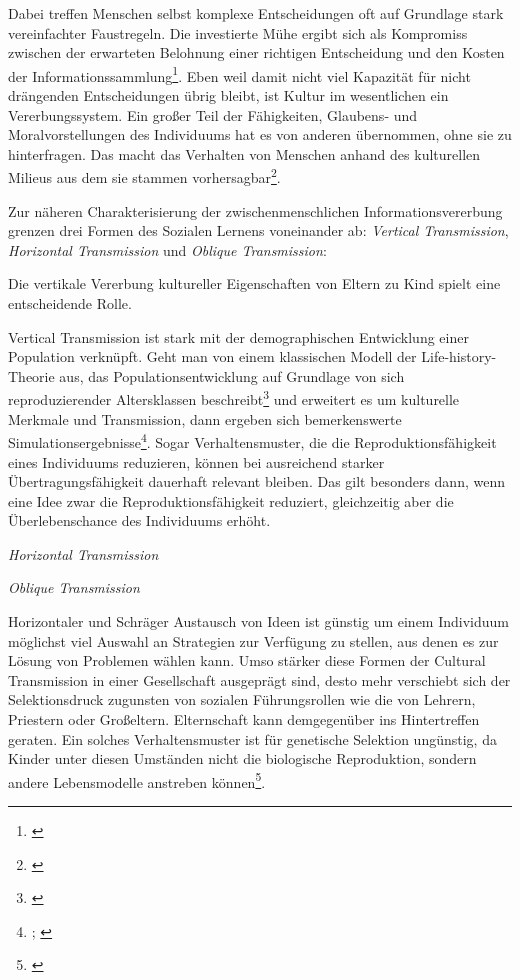 \documentclass[openany,twoside,twocolumn]{book}
\let\rmarkdownfootnote\footnote%
\def\footnote{\protect\rmarkdownfootnote}
\begin{document}
Dabei treffen Menschen selbst komplexe Entscheidungen oft auf Grundlage
stark vereinfachter Faustregeln. Die investierte Mühe ergibt sich als
Kompromiss zwischen der erwarteten Belohnung einer richtigen
Entscheidung und den Kosten der Informationssammlung\footnote{\textcite{nisbett_human_1980}}.
Eben weil damit nicht viel Kapazität für nicht drängenden Entscheidungen
übrig bleibt, ist Kultur im wesentlichen ein Vererbungssystem. Ein
großer Teil der Fähigkeiten, Glaubens- und Moralvorstellungen des
Individuums hat es von anderen übernommen, ohne sie zu hinterfragen. Das
macht das Verhalten von Menschen anhand des kulturellen Milieus aus dem
sie stammen vorhersagbar\footnote{\textcite{smith_cultural_1992}}.

Zur näheren Charakterisierung der zwischenmenschlichen
Informationsvererbung grenzen \autocite{cavalli-sforza_cultural_1981}
drei Formen des Sozialen Lernens voneinander ab: \emph{Vertical
Transmission}, \emph{Horizontal Transmission} und \emph{Oblique
Transmission}:

Die vertikale Vererbung kultureller Eigenschaften von Eltern zu Kind
spielt eine entscheidende Rolle.

Vertical Transmission ist stark mit der demographischen Entwicklung
einer Population verknüpft. Geht man von einem klassischen Modell der
Life-history-Theorie aus, das Populationsentwicklung auf Grundlage von
sich reproduzierender Altersklassen beschreibt\footnote{\textcite{leslie_further_1948}}
und erweitert es um kulturelle Merkmale und Transmission, dann ergeben
sich bemerkenswerte Simulationsergebnisse\footnote{\textcite{coratenuto_age_1989};
  \textcite{fogarty_role_2013}}. Sogar Verhaltensmuster, die die
Reproduktionsfähigkeit eines Individuums reduzieren, können bei
ausreichend starker Übertragungsfähigkeit dauerhaft relevant bleiben.
Das gilt besonders dann, wenn eine Idee zwar die Reproduktionsfähigkeit
reduziert, gleichzeitig aber die Überlebenschance des Individuums
erhöht.

\autocite{mulder_intergenerational_2009}

\emph{Horizontal Transmission}

\emph{Oblique Transmission} \autocite{fogarty_evolution_2011}

Horizontaler und Schräger Austausch von Ideen ist günstig um einem
Individuum möglichst viel Auswahl an Strategien zur Verfügung zu
stellen, aus denen es zur Lösung von Problemen wählen kann. Umso stärker
diese Formen der Cultural Transmission in einer Gesellschaft ausgeprägt
sind, desto mehr verschiebt sich der Selektionsdruck zugunsten von
sozialen Führungsrollen wie die von Lehrern, Priestern oder Großeltern.
Elternschaft kann demgegenüber ins Hintertreffen geraten. Ein solches
Verhaltensmuster ist für genetische Selektion ungünstig, da Kinder unter
diesen Umständen nicht die biologische Reproduktion, sondern andere
Lebensmodelle anstreben können\footnote{\textcite{smith_cultural_1992}}.
\end{document}
